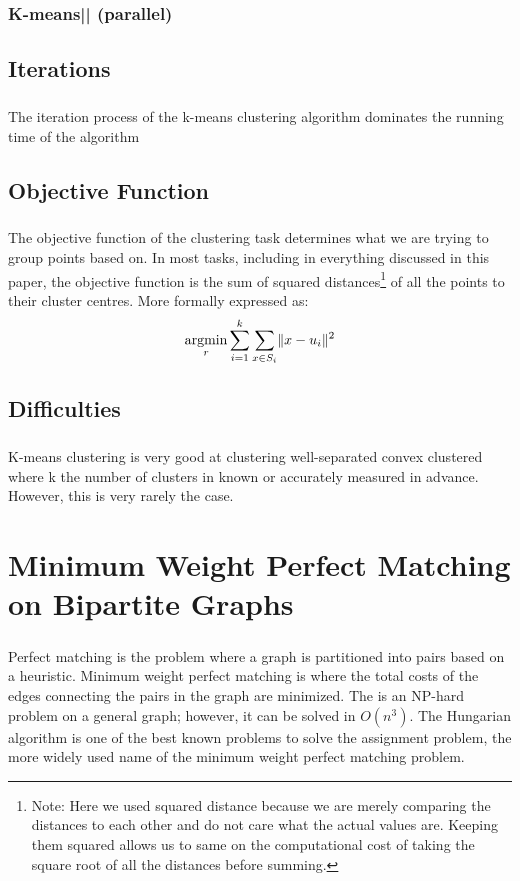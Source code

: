 \documentclass[12pt]{dalthesis}
\DeclarePairedDelimiter\norm{\lVert}{\rVert}%
\DeclareMathOperator*{\argmin}{argmin}
\begin{document}
\subsection{K-means|| (parallel)}
\section{Iterations}
\paragraph{}
The iteration process of the k-means clustering algorithm dominates the running time of the algorithm 

\section{Objective Function}
\paragraph{}
The objective function of the clustering task determines what we are trying to group points based on. In most tasks, including in everything discussed in this paper, the objective function is the sum of squared distances\footnote{Note: Here we used squared distance because we are merely comparing the distances to each other and do not care what the actual values are. Keeping them squared allows us to same on the computational cost of taking the square root of all the distances before summing.}
of all the points to their cluster centres. More formally expressed as:
$$\argmin\limits_r\sum_{i=1}^{k}\sum_{x\in S_i}\norm{ x-u_i}^2$$


\section{Difficulties}
\paragraph{}
K-means clustering is very good at clustering well-separated convex clustered where k the number of clusters in known or accurately measured in advance. However, this is very rarely the case.
\chapter{Minimum Weight Perfect Matching on Bipartite Graphs}
\paragraph{}
Perfect matching is the problem where a graph is partitioned into pairs based on a heuristic. Minimum weight perfect matching is where the total costs of the edges connecting the pairs in the graph are minimized. The is an NP-hard problem on a general graph; however, it can be solved in $O(n^3)$. The Hungarian algorithm is one of the best known problems to solve the assignment problem, the more widely used name of the minimum weight perfect matching problem.
\end{document}
